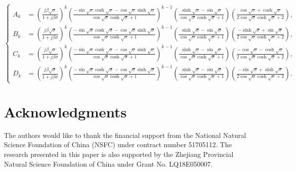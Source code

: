 \documentclass{svjour3}                     %
\begin{document}
\begin{equation*}
    \left\{\begin{aligned}
        A_{k} &= \left( \frac{j \beta \sqrt{\sigma }}{1+j \beta \sigma } \right)^{k} \left( \frac{ -\sin\sqrt{\sigma} \cosh\sqrt{\sigma} - \cos\sqrt{\sigma} \sinh\sqrt{\sigma} }{ \cos\sqrt{\sigma }\cosh\sqrt{\sigma }+1 } \right)^{k-1} \left( \frac{\sinh\sqrt{\sigma }-\sin\sqrt{\sigma }}{\cos\sqrt{\sigma } \cosh\sqrt{\sigma }+1} \right) \left(\frac{\cos\sqrt{\sigma }+\cosh\sqrt{\sigma }}{2 \cos\sqrt{\sigma }\cosh\sqrt{\sigma }+2} \right), \\
        B_{k} &= \left( \frac{j \beta \sqrt{\sigma }}{1+j \beta \sigma } \right)^{k}  \left( \frac{ -\sin\sqrt{\sigma} \cosh\sqrt{\sigma} - \cos\sqrt{\sigma} \sinh\sqrt{\sigma} }{ \cos\sqrt{\sigma }\cosh\sqrt{\sigma }+1 } \right)^{k-1} \left( \frac{\sinh\sqrt{\sigma }-\sin\sqrt{\sigma }}{\cos\sqrt{\sigma } \cosh\sqrt{\sigma }+1} \right) \left( \frac{-\sinh\sqrt{\sigma }+\sin\sqrt{\sigma }}{2 \cos\sqrt{\sigma }\cosh\sqrt{\sigma }+2} \right), \\
        C_{k} &= \left( \frac{j \beta \sqrt{\sigma }}{1+j \beta \sigma } \right)^{k}  \left( \frac{ -\sin\sqrt{\sigma} \cosh\sqrt{\sigma} - \cos\sqrt{\sigma} \sinh\sqrt{\sigma} }{ \cos\sqrt{\sigma }\cosh\sqrt{\sigma }+1 } \right)^{k-1} \left( \frac{\sinh\sqrt{\sigma }-\sin\sqrt{\sigma }}{\cos\sqrt{\sigma } \cosh\sqrt{\sigma }+1} \right) \left( \frac{-\cos\sqrt{\sigma }-\cosh\sqrt{\sigma }}{2 \cos\sqrt{\sigma } \cosh\sqrt{\sigma }+2} \right), \\
        D_{k} &= \left( \frac{j \beta \sqrt{\sigma }}{1+j \beta \sigma } \right)^{k} \left( \frac{ -\sin\sqrt{\sigma} \cosh\sqrt{\sigma} - \cos\sqrt{\sigma} \sinh\sqrt{\sigma} }{ \cos\sqrt{\sigma }\cosh\sqrt{\sigma }+1 } \right)^{k-1} \left( \frac{\sinh\sqrt{\sigma }-\sin\sqrt{\sigma }}{\cos\sqrt{\sigma } \cosh\sqrt{\sigma }+1} \right) \left( \frac{-\sin\sqrt{\sigma }+\sinh\sqrt{\sigma }}{2 \cos\sqrt{\sigma }\cosh\sqrt{\sigma }+2} \right).
    \end{aligned}\right.
\end{equation*}
\normalsize



\section*{Acknowledgments}
The authors would like to thank the financial support from the National Natural Science Foundation of China (NSFC) under contract number 51705112. The research presented in this paper is also supported by the Zhejiang Provincial Natural Science Foundation of China under Grant No. LQ18E050007.



\end{document}
